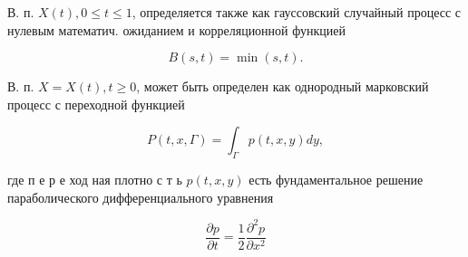 \documentclass[10pt]{article}
\begin{document}
В. п. $X(t), 0 \leqslant t \leqslant 1$, определяется также как гауссовский случайный процесс с нулевым математич. ожиданием и корреляционной функцией



\[

B(s, t)=\min (s, t) .

\]



В. п. $X=X(t), t \geqslant 0$, может быть определен как однородный марковский процесс с переходной функцией



\[

P(t, x, \Gamma)=\int_{\Gamma} p(t, x, y) d y,

\]



где п е р е ход ная плотно с т ь $p(t, x, y)$ есть фундаментальное решение параболического дифференциального уравнения



\[

\frac{\partial p}{\partial t}=\frac{1}{2} \frac{\partial^{2} p}{\partial x^{2}}

\]
\end{document}
